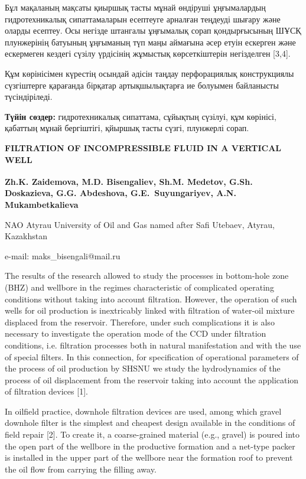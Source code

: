 Бұл мақаланың мақсаты қиыршық тасты мұнай өндіруші ұңғымалардың
гидротехникалық сипаттамаларын есептеуге арналған теңдеуді шығару және
оларды есептеу. Осы негізде штангалы ұңғымалық сорап қондырғысының ШҰСҚ
плунжерінің батуының ұңғыманың түп маңы аймағына әсер етуін ескерген
және ескермеген кездегі сүзілу үрдісінің жұмыстық көрсеткіштерін
негізделген {[}3,4{]}.

Құм көрінісімен күрестің осындай әдісін таңдау перфорациялық
конструкциялы сүзгіштерге қарағанда бірқатар артықшылықтарға ие болуымен
байланысты түсіндіріледі.

{\bfseries Түйін сөздер:} гидротехникалық сипаттама, сұйықтың сүзілуі, құм
көрінісі, қабаттың мұнай бергіштігі, қйыршық тасты сүзгі, плунжерлі
сорап.

\begin{articleheader}
{\bfseries FILTRATION OF INCOMPRESSIBLE FLUID IN A VERTICAL WELL}

{\bfseries
Zh.K. Zaidemova,
M.D. Bisengaliev\textsuperscript{\envelope },
Sh.M. Medetov,
G.Sh. Doskazieva,
G.G. Abdeshova,
G.E.~Suyungariyev,
A.N. Mukambetkalieva
}
\end{articleheader}

\begin{affiliation}
NAO Atyrau University of Oil and Gas named after Safi Utebaev, Atyrau, Kazakhstan

e-mail: maks\_bisengali@mail.ru
\end{affiliation}

The results of the research allowed to study the processes in
bottom-hole zone (BHZ) and wellbore in the regimes characteristic of
complicated operating conditions without taking into account filtration.
However, the operation of such wells for oil production is inextricably
linked with filtration of water-oil mixture displaced from the
reservoir. Therefore, under such complications it is also necessary to
investigate the operation mode of the CCD under filtration conditions,
i.e. filtration processes both in natural manifestation and with the use
of special filters. In this connection, for specification of operational
parameters of the process of oil production by SHSNU we study the
hydrodynamics of the process of oil displacement from the reservoir
taking into account the application of filtration devices {[}1{]}.

In oilfield practice, downhole filtration devices are used, among which
gravel downhole filter is the simplest and cheapest design available in
the conditions of field repair {[}2{]}. To create it, a coarse-grained
material (e.g., gravel) is poured into the open part of the wellbore in
the productive formation and a net-type packer is installed in the upper
part of the wellbore near the formation roof to prevent the oil flow
from carrying the filling away.

